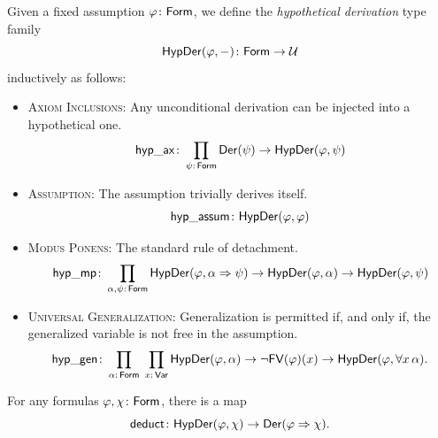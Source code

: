 \begin{defn}
    Given a fixed assumption $\varphi\colon\fun{Form}$, we define the \textsl{hypothetical derivation} type family
    \[
        \fun{HypDer}(\varphi,\dummy)\colon
            \fun{Form}\to\univ
    \]
    inductively as follows:
    \begin{itemize}
        \item \textsc{Axiom Inclusions:} Any unconditional derivation can be injected into a hypothetical one.
        \[
            \fun{hyp\_ax}\colon
                \prod_{\psi\colon\fun{Form}}
                    \fun{Der}(\psi)
                    \to
                    \fun{HypDer}(\varphi,\psi)
        \]
        \item \textsc{Assumption:} The assumption trivially derives itself.
        \[
            \fun{hyp\_assum}\colon
                \fun{HypDer}(\varphi,\varphi)
        \]
        \item \textsc{Modus Ponens:} The standard rule of detachment.
        \[
            \fun{hyp\_mp}\colon
                \prod_{\alpha,\psi\colon\fun{Form}}
                    \fun{HypDer}(\varphi,\alpha\imp\psi)
                    \to
                    \fun{HypDer}(\varphi,\alpha)
                    \to
                    \fun{HypDer}(\varphi,\psi)
        \]
        \item \textsc{Universal Generalization:} Generalization is permitted if, and only if, the generalized variable is not free in the assumption.
        \[
            \fun{hyp\_gen}\colon
                \prod_{\alpha\colon\fun{Form}}\;
                \prod_{x\colon\fun{Var}}
                    \fun{HypDer}(\varphi,\alpha)
                    \to
                    \neg\fun{FV}(\varphi)(x)
                    \to
                    \fun{HypDer}(
                        \varphi,
                        \forall x\,\alpha
                    ).
        \]
    \end{itemize}
\end{defn}

\begin{thm}
    \label{thm:deduction-theorem}
    For any formulas\/ $\varphi, \chi\colon\fun{Form}$, there is a map
    \[
        \fun{deduct}\colon\fun{HypDer}(\varphi,\chi)
        \to
        \fun{Der}(\varphi\imp\chi).
    \]
\end{thm}

